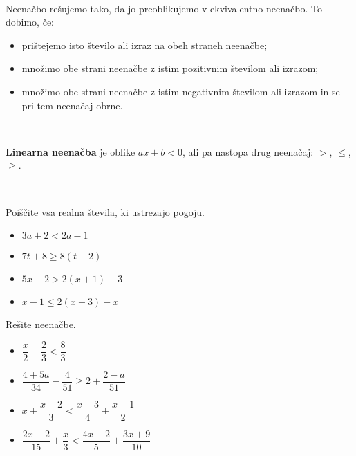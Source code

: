                 ~

                Neenačbo rešujemo tako, da jo preoblikujemo v ekvivalentno neenačbo. To dobimo, če:
                \begin{itemize}
                    \item prištejemo isto število ali izraz na obeh straneh neenačbe;
                    \item množimo obe strani neenačbe z istim pozitivnim številom ali izrazom;
                    \item množimo obe strani neenačbe z istim negativnim številom ali izrazom in se pri tem neenačaj obrne.
                \end{itemize}
            
                ~
            
                \textbf{Linearna neenačba} je oblike $ax+b<0$, ali pa nastopa drug neenačaj: $>$, $\leq$, $\geq$.
            
        
~~~



        
                
                    \begin{naloga}
                        Poiščite vsa realna števila, ki ustrezajo pogoju.
                        \begin{itemize}
                                \item $3a+2<2a-1$ 
                                \item $7t+8\geq 8(t-2)$ 
                                \item $5x-2>2(x+1)-3$ 
                                \item $x-1\leq 2(x-3)-x$ 
                        \end{itemize}
                    \end{naloga}
                
        
        
                
                    \begin{naloga}
                        Rešite neenačbe.
                        \begin{itemize}
                                \item $\dfrac{x}{2}+\dfrac{2}{3}<\dfrac{8}{3}$ 
                                \item $\dfrac{4+5a}{34}-\dfrac{4}{51}\geq 2+\dfrac{2-a}{51}$ 
                                \item $x+\dfrac{x-2}{3}<\dfrac{x-3}{4}+\dfrac{x-1}{2}$ 
                                \item $\dfrac{2x-2}{15}+\dfrac{x}{3}<\dfrac{4x-2}{5}+\dfrac{3x+9}{10}$ 
                        \end{itemize}
                    \end{naloga}
                
